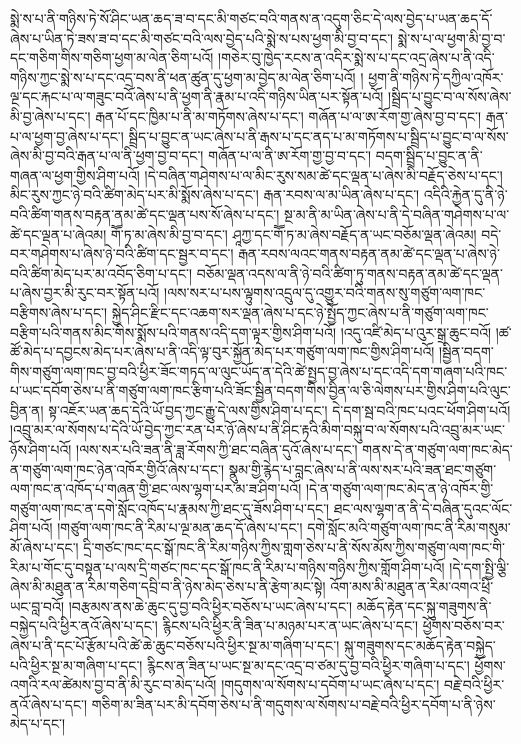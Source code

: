 སྨེ་ས་པ་ནི་གཉིས་ཏེ་སོ་ཤིང་ཡན་ཆད་ཟ་བ་དང་མི་གཙང་བའི་གནས་ན་འདུག་ཅིང་དེ་ལས་བྱེད་པ་ཡན་ཆད་དོ་ཞེས་པ་ཡིན་ཏེ་ཟས་ཟ་བ་དང་མི་གཙང་བའི་ལས་བྱེད་པའི་སྨེ་ས་པས་ཕྱག་མི་བྱ་བ་དང་། སྨེ་ས་པ་ལ་ཕྱག་མི་བྱ་བ་དང་གཅིག་གིས་གཅིག་ཕྱག་མ་ལེན་ཅིག་པའོ། །གཅེར་བུ་ཁྱེད་རངས་ན་འདིར་སྨེ་ས་པ་དང་འདྲ་ཞེས་པ་ནི་འདི་གཉིས་ཀྱང་སྨེ་ས་པ་དང་འདྲ་བས་ནི་ཕན་ཚུན་དུ་ཕྱག་མ་བྱེད་མ་ལེན་ཅིག་པའོ། །
ཕྱག་ནི་གཉིས་ཏེ་དཀྱིལ་འཁོར་ལྔ་དང་རྐང་པ་ལ་གཟུང་བའོ་ཞེས་པ་ནི་ཕྱག་ནི་རྣམ་པ་འདི་གཉིས་ཡིན་པར་སྟོན་པའོ། །སྦྲིད་པ་བྱུང་བ་ལ་སོས་ཞེས་མི་བྱ་ཞེས་པ་དང་། རྒན་པོ་དང་ཁྱིམ་པ་ནི་མ་གཏོགས་ཞེས་པ་དང་། གཞོན་པ་ལ་ཨ་རོག་གྱ་ཞེས་བྱ་བ་དང་། རྒན་པ་ལ་ཕྱག་བྱ་ཞེས་པ་དང་། སྦྲིད་པ་བྱུང་ན་ཡང་ཞེས་པ་ནི་རྒས་པ་དང་ནད་པ་མ་གཏོགས་པ་སྦྲིད་པ་བྱུང་བ་ལ་སོས་ཞེས་མི་བྱ་བའི་རྒན་པ་ལ་ནི་ཕྱག་བྱ་བ་དང་། གཞོན་པ་ལ་ནི་ཨ་རོག་གྱ་བྱ་བ་དང་། བདག་སྦྲིད་པ་བྱུང་ན་ནི་གཞན་ལ་ཕྱག་གྱིས་ཤིག་པའོ། །དེ་བཞིན་གཤེགས་པ་ལ་མིང་རུས་སམ་ཚེ་དང་ལྡན་པ་ཞེས་མི་བརྗོད་ཅེས་པ་དང་། མིང་རུས་ཀྱང་ཉེ་བའི་ཚིག་མེད་པར་མི་སྨོས་ཞེས་པ་དང་། རྒན་རབས་ལ་མ་ཡིན་ཞེས་པ་དང་། འདིའི་རྐྱེན་དུ་ནི་ཉེ་བའི་ཚིག་གནས་བརྟན་ནམ་ཚེ་དང་ལྡན་པས་སོ་ཞེས་པ་དང་། སྔ་མ་ནི་མ་ཡིན་ཞེས་པ་ནི་དེ་བཞིན་གཤེགས་པ་ལ་ཚེ་དང་ལྡན་པ་ཞེའམ། གཽ་ཏ་མ་ཞེས་མི་བྱ་བ་དང་། ཤཱཀྱ་དང་གཽ་ཏ་མ་ཞེས་བརྗོད་ན་ཡང་བཅོམ་ལྡན་ཞེའམ། བདེ་བར་གཤེགས་པ་ཞེས་ཉེ་བའི་ཚིག་དང་སྦྱར་བ་དང་། རྒན་རབས་ལའང་གནས་བརྟན་ནམ་ཚེ་དང་ལྡན་པ་ཞེས་ཉེ་བའི་ཚིག་མེད་པར་མ་འབོད་ཅིག་པ་དང་། བཅོམ་ལྡན་འདས་ལ་ནི་ཉེ་བའི་ཚིག་ཏུ་གནས་བརྟན་ནམ་ཚེ་དང་ལྡན་པ་ཞེས་བྱར་མི་རུང་བར་སྟོན་པའོ། །ལས་སར་པ་པས་ལྟུགས་འདྲུལ་དུ་འགྱུར་བའི་གནས་སུ་གཙུག་ལག་ཁང་བརྩིགས་ཞེས་པ་དང་། སྐྱེད་ཤིང་རྫིང་དང་འཆག་སར་ལྡན་ཞེས་པ་དང་ཉེ་སྤྱོད་ཀྱང་ཞེས་པ་ནི་གཙུག་ལག་ཁང་བརྩིག་པའི་གནས་མིང་གིས་སྨོས་པའི་གནས་འདི་དག་ལྟར་གྱིས་ཤིག་པའོ། །འདུ་འཛི་མེད་པ་འུར་སྒྲ་ཆུང་བའོ། །ཚ་ཚོ་མེད་པ་དབྱངས་མེད་པར་ཞེས་པ་ནི་འདི་ལྟ་བུར་སྐྱོན་མེད་པར་གཙུག་ལག་ཁང་གྱིས་ཤིག་པའོ། །སྦྱིན་བདག་གིས་གཙུག་ལག་ཁང་བྱ་བའི་ཕྱིར་ཟོང་གཏད་ལ་ལུང་ཡོད་ན་དེའི་ཚེ་སྤྱད་བྱ་ཞེས་པ་དང་འདི་དག་གཞག་པའི་ཁང་པ་ཡང་དབོག་ཅེས་པ་ནི་གཙུག་ལག་ཁང་རྩིག་པའི་ཟོང་སྦྱིན་བདག་གིས་བྱིན་ལ་ཅི་ལེགས་པར་གྱིས་ཤིག་པའི་ལུང་བྱིན་ན། སྟ་འཇོར་ཡན་ཆད་དེའི་ཡོ་བྱད་ཀྱང་རྒྱུ་དེ་ལས་གྱིས་ཤིག་པ་དང་། དེ་དག་སྦ་བའི་ཁང་པའང་ཕོག་ཤིག་པའོ། །འབྲུ་མར་ལ་སོགས་པ་དེའི་ཡོ་བྱེད་ཀྱང་རན་པར་ཉོ་ཞེས་པ་ནི་ཤིང་རྟའི་མིག་བསྐུ་བ་ལ་སོགས་པའི་འབྲུ་མར་ཡང་ཉོས་ཤིག་པའོ། །ལས་སར་པའི་ཟན་ནི་ཟླ་རོགས་ཀྱི་ཐང་བཞིན་དུའོ་ཞེས་པ་དང་། གནས་དེ་ན་གཙུག་ལག་ཁང་མེད་ན་གཙུག་ལག་ཁང་ཉེན་འཁོར་གྱིའོ་ཞེས་པ་དང་། སྣུམ་གྱི་རྙེད་པ་བླང་ཞེས་པ་ནི་ལས་སར་པའི་ཟན་ཐང་གཙུག་ལག་ཁང་ན་འཁོད་པ་གཞན་གྱི་ཐང་ལས་ལྷག་པར་མ་ཟ་ཤིག་པའོ། །དེ་ན་གཙུག་ལག་ཁང་མེད་ན་ཉེ་འཁོར་གྱི་གཙུག་ལག་ཁང་ན་དགེ་སློང་འཁོད་པ་རྣམས་ཀྱི་ཐང་དུ་ཟོས་ཤིག་པ་དང་། ཐང་ལས་ལྷག་ན་ནི་དེ་བཞིན་དུའང་ལོང་ཤིག་པའོ། །གཙུག་ལག་ཁང་ནི་རིམ་པ་ལྔ་མན་ཆད་དོ་ཞེས་པ་དང་། དགེ་སློང་མའི་གཙུག་ལག་ཁང་ནི་རིམ་གསུམ་མོ་ཞེས་པ་དང་། དྲི་གཙང་ཁང་དང་སྒོ་ཁང་ནི་རིམ་གཉིས་ཀྱིས་གླག་ཅེས་པ་ནི་སོས་མོས་ཀྱིས་གཙུག་ལག་ཁང་གི་རིམ་པ་གོང་དུ་བསྟན་པ་ལས་དྲི་གཙང་ཁང་དང་སྒོ་ཁང་ནི་རིམ་པ་གཉིས་གཉིས་ཀྱིས་གློག་ཤིག་པའོ། །དེ་དག་སྤྱི་ལྕི་ཞེས་མི་མཐུན་ན་རིམ་གཅིག་དབྲི་བ་ནི་ཉེས་མེད་ཅེས་པ་ནི་རྩེག་མང་སྟེ། འོག་མས་མི་མཐུན་ན་རིམ་འགའ་ཕྲི་ཡང་བླ་བའོ། །བརྩམས་ནས་ཆེ་ཆུང་དུ་བྱ་བའི་ཕྱིར་བཅོས་པ་ཡང་ཞེས་པ་དང་། མཆོད་རྟེན་དང་སྐུ་གཟུགས་ནི་བསྐྱེད་པའི་ཕྱིར་ནའོ་ཞེས་པ་དང་། རྙིངས་པའི་ཕྱིར་ནི་ཟིན་པ་མཉམ་པར་ན་ཡང་ཞེས་པ་དང་། ཕྱོགས་བཅོས་བར་ཞེས་པ་ནི་དང་པོ་རྩོམ་པའི་ཚེ་ཆེ་ཆུང་བཅོས་པའི་ཕྱིར་སྔ་མ་གཞིག་པ་དང་། སྐུ་གཟུགས་དང་མཆོད་རྟེན་བསྐྱེད་པའི་ཕྱིར་སྔ་མ་གཞིག་པ་དང་། རྙིངས་ན་ཟིན་པ་ཡང་སྔ་མ་དང་འདྲ་བ་ཙམ་དུ་བྱ་བའི་ཕྱིར་གཞིག་པ་དང་། ཕྱོགས་འགའི་རལ་ཚེམས་བྱ་བ་ནི་མི་རུང་བ་མེད་པའོ། །གདུགས་ལ་སོགས་པ་དབོག་པ་ཡང་ཞེས་པ་དང་། བརྗེ་བའི་ཕྱིར་ནའོ་ཞེས་པ་དང་། གཅིག་མ་ཟིན་པར་མི་དབོག་ཅེས་པ་ནི་གདུགས་ལ་སོགས་པ་བརྗེ་བའི་ཕྱིར་དབོག་པ་ནི་ཉེས་མེད་པ་དང་། 